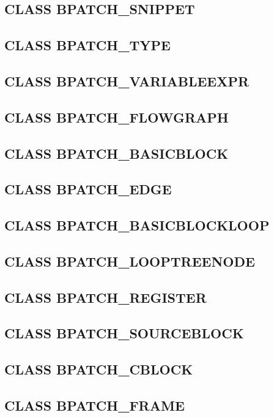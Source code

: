 









\subsection{CLASS BPATCH\_SNIPPET}
\subsection{CLASS BPATCH\_TYPE}
\subsection{CLASS BPATCH\_VARIABLEEXPR}
\subsection{CLASS BPATCH\_FLOWGRAPH}\label{sec:bpatch_flowgraph}
\subsection{CLASS BPATCH\_BASICBLOCK}
\subsection{CLASS BPATCH\_EDGE}
\subsection{CLASS BPATCH\_BASICBLOCKLOOP}
\subsection{CLASS BPATCH\_LOOPTREENODE}
\subsection{CLASS BPATCH\_REGISTER}
\subsection{CLASS BPATCH\_SOURCEBLOCK}
\subsection{CLASS BPATCH\_CBLOCK}\label{sec:bpatch_cblock}
\subsection{CLASS BPATCH\_FRAME}\label{sec:bpatch_frame}
